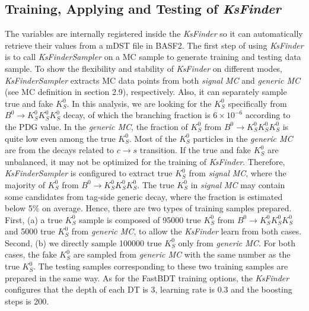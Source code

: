 \begin{comment}
\begin{minipage}[ht]{0.5\linewidth}
\centering 
\texttt{[image: rank1]}
\end{minipage}
\end{comment}
	


\subsection{Training, Applying and Testing of \textit{KsFinder}}
The variables are internally registered inside the \textit{KsFinder} so it can automatically retrieve their values from a mDST file in BASF2. The first step of using \textit{KsFinder} is to call \textit{KsFinderSampler} on a MC sample to generate training and testing data sample. To show the flexibility and stability of \textit{KsFinder} on different modes, \textit{KsFinderSampler} extracts MC data points from both \textit{signal MC} and \textit{generic MC} (see MC definition in section 2.9), respectively. Also, it can separately sample true and fake $K_S^0$. In this analysis, we are looking for the $K_S^0$ specifically from  $B^0 \to K_S^0  K_S^0  K_S^0$ decay, of which the branching fraction is $6\times 10^{-6}$ according to the PDG value. In the \textit{generic MC}, the fraction of $K_S^0$ from $B^0 \to K_S^0  K_S^0  K_S^0$ is quite low even among the true $K_S^0$. Most of the $K_S^0$ particles in the \textit{generic MC} are from the decays related to $ c \to s$ transition. If the true and fake $K_S^0$ are unbalanced, it may not be optimized for the training of \textit{KsFinder}. Therefore, \textit{KsFinderSampler} is configured to extract true $K_S^0$ from \textit{signal MC}, where the majority of $K_S^0$ from $B^0 \to K_S^0  K_S^0  K_S^0$. The true $K_S^0$ in \textit{signal MC} may contain some candidates from tag-side generic decay, where the fraction is estimated below 5\% on average. Hence, there are two types of training samples prepared. First, (a) a true $K_S^0$ sample is composed of 95000 true $K_S^0$ from $B^0 \to K_S^0  K_S^0  K_S^0$ and 5000  true $K_S^0$ from \textit{generic MC}, to allow the \textit{KsFinder} learn from both cases. Second, (b) we directly sample 100000 true $K_S^0$ only from \textit{generic MC}. For both cases, the fake $K_S^0$ are sampled from \textit{generic MC} with the same number as the true $K_S^0$. The testing samples corresponding to these two training samples are prepared in the same way. As for the FastBDT training options, the \textit{KsFinder} configures that the depth of each DT is 3, learning rate is 0.3 and the boosting steps is 200. 

